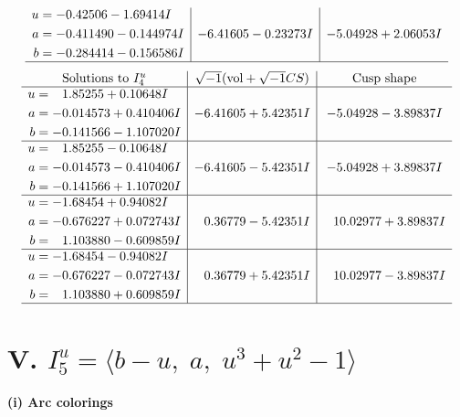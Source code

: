 \documentclass[1p]{elsarticle_modified}
\theoremstyle{definition}
\newcommand{\I}{\sqrt{-1}}
\begin{document}
$$\begin{array}{c|c|c}
\begin{aligned}
u &= -0.42506 - 1.69414 I \\
a &= -0.411490 - 0.144974 I \\
b &= -0.284414 - 0.156586 I\end{aligned}
 & -6.41605 - 0.23273 I & -5.04928 + 2.06053 I\\
 \hline 
 \end{array}$$\newpage$$\begin{array}{c|c|c}  
\text{Solutions to }I^u_{4}& \I (\text{vol} + \sqrt{-1}CS) & \text{Cusp shape}\\
 \hline 
\begin{aligned}
u &= \phantom{-}1.85255 + 0.10648 I \\
a &= -0.014573 + 0.410406 I \\
b &= -0.141566 - 1.107020 I\end{aligned}
 & -6.41605 + 5.42351 I & -5.04928 - 3.89837 I \\ \hline\begin{aligned}
u &= \phantom{-}1.85255 - 0.10648 I \\
a &= -0.014573 - 0.410406 I \\
b &= -0.141566 + 1.107020 I\end{aligned}
 & -6.41605 - 5.42351 I & -5.04928 + 3.89837 I \\ \hline\begin{aligned}
u &= -1.68454 + 0.94082 I \\
a &= -0.676227 + 0.072743 I \\
b &= \phantom{-}1.103880 - 0.609859 I\end{aligned}
 & \phantom{-}0.36779 - 5.42351 I & \phantom{-}10.02977 + 3.89837 I \\ \hline\begin{aligned}
u &= -1.68454 - 0.94082 I \\
a &= -0.676227 - 0.072743 I \\
b &= \phantom{-}1.103880 + 0.609859 I\end{aligned}
 & \phantom{-}0.36779 + 5.42351 I & \phantom{-}10.02977 - 3.89837 I\\
 \hline 
 \end{array}$$\newpage\newpage\renewcommand{\arraystretch}{1}
\centering \section*{V. $I^u_{5}= \langle b- u,\;a,\;u^3+u^2-1 \rangle$}
\flushleft \textbf{(i) Arc colorings}\\
\end{document}
